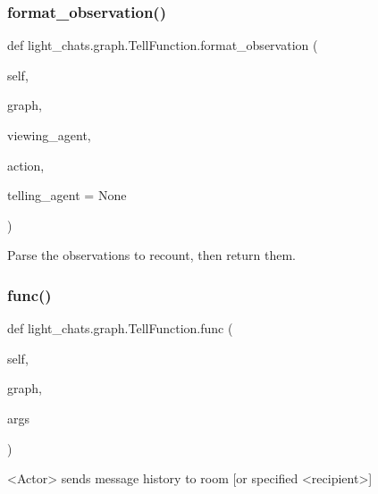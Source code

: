 \subsubsection{\texorpdfstring{format\+\_\+observation()}{format\_observation()}}
{\footnotesize\ttfamily def light\+\_\+chats.\+graph.\+Tell\+Function.\+format\+\_\+observation (\begin{DoxyParamCaption}\item[{}]{self,  }\item[{}]{graph,  }\item[{}]{viewing\+\_\+agent,  }\item[{}]{action,  }\item[{}]{telling\+\_\+agent = {\ttfamily None} }\end{DoxyParamCaption})}

\begin{DoxyVerb}Parse the observations to recount, then return them.
\end{DoxyVerb}
 \mbox{\label{classlight__chats_1_1graph_1_1TellFunction_a91e865e9bbba1f3ed3f01445896be21d}} 
\subsubsection{\texorpdfstring{func()}{func()}}
{\footnotesize\ttfamily def light\+\_\+chats.\+graph.\+Tell\+Function.\+func (\begin{DoxyParamCaption}\item[{}]{self,  }\item[{}]{graph,  }\item[{}]{args }\end{DoxyParamCaption})}

\begin{DoxyVerb}<Actor> sends message history to room [or specified <recipient>]
\end{DoxyVerb}
 \mbox{\label{classlight__chats_1_1graph_1_1TellFunction_a1ce8fd5a8ee86a01e68e9115f8cc9108}} 
